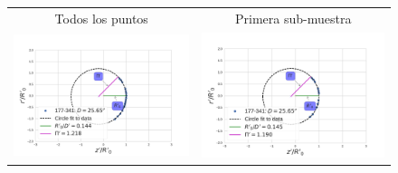 \begin{figure}
  \centering
\begin{tabular}{cc}
 
Todos los puntos & Primera sub-muestra  \\ \includegraphics[clip]{./Programs/LV-bowshocks-xyfancy-positionswill-177-341} & \includegraphics[clip]{./Programs/Multi-Fit/samp00/LV-bowshocks-xyfancy-positionssamp00-177-341} \\

\end{tabular}
\end{figure}
